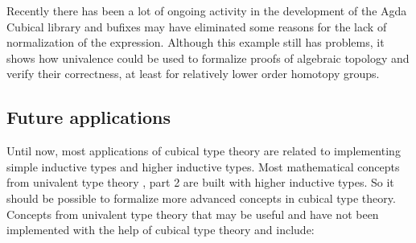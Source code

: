 \documentclass[12pt,a4paper,twoside,xetex]{book}
\begin{document}
Recently there has been a lot of ongoing activity in the development of the Agda Cubical library and bufixes may have eliminated some reasons for the lack of normalization of the expression. Although this example still has problems, it shows how univalence could be used to formalize proofs of algebraic topology and verify their correctness, at least for relatively lower order homotopy groups.

\subsection{Future applications}\label{futapp}

Until now, most applications of cubical type theory are related to implementing simple inductive types and higher inductive types. Most mathematical concepts from univalent type theory \cite{Voevodsky2013}, part 2 are built with higher inductive types. So it should be possible to formalize more advanced concepts in cubical type theory. Concepts from univalent type theory that may be useful and have not been implemented with the help of cubical type theory and \cite{Moertberg2018} include:
\end{document}
